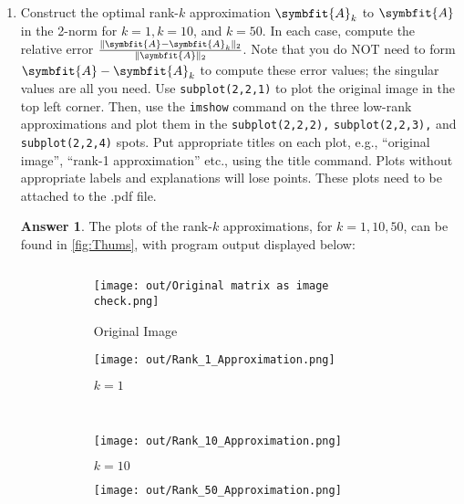 \documentclass{article}
\theoremstyle{definition}
\newtheorem*{answer}{Answer}
\newcommand{\mat}[1]{\symbfit{#1}}
\begin{document}
\begin{enumerate}[leftmargin=\labelsep]
\begin{enumerate}
		      \item Construct the optimal rank-\(k\) approximation \(\mat{A}_k\) to \(\mat{A}\) in the 2-norm for \(k = 1, k = 10\), and \(k = 50\). In each case, compute the relative error \(\frac{\|\mat{A} - \mat{A}_k\|_2}{\|\mat{A}\|_2}\). Note that you do NOT need to form \(\mat{A} - \mat{A}_k\) to compute these error values; the singular values are all you need. Use \texttt{subplot(2,2,1)} to plot the original image in the top left corner. Then, use the \texttt{imshow} command on the three low-rank approximations and plot them in the \texttt{subplot(2,2,2),} \texttt{subplot(2,2,3),} and \texttt{subplot(2,2,4)} spots. Put appropriate titles on each plot, e.g., ``original image'', ``rank-1 approximation'' etc., using the title command. Plots without appropriate labels and explanations will lose points. These plots need to be attached to the .pdf file.
		            \begin{answer} The plots of the rank-\(k\) approximations, for \(k=1,10,50\), can be found in \cref{fig:Thums}, with program output displayed below:
			            \begin{mdframed}[backgroundcolor=lightgray]
				            \inputminted{text}{out/output.txt}
			            \end{mdframed}
			            \begin{figure}[H]
				            \centering
				            \begin{subfigure}{0.225\textwidth}
					            \centering
					            \texttt{[image: out/Original matrix as image check.png]}
					            \caption{Original Image}\label{fig:ogThumb}
				            \end{subfigure}\qquad
				            \begin{subfigure}{0.225\textwidth}
					            \centering
					            \texttt{[image: out/Rank\_1\_Approximation.png]}
					            \caption{\(k=1\)}\label{fig:Thumb1}
				            \end{subfigure}\\
				            \begin{subfigure}{0.225\textwidth}
					            \centering
					            \texttt{[image: out/Rank\_10\_Approximation.png]}
					            \caption{\(k=10\)}\label{fig:Thumb10}
				            \end{subfigure}\qquad
				            \begin{subfigure}{0.225\textwidth}
					            \centering
					            \texttt{[image: out/Rank\_50\_Approximation.png]}

\end{subfigure}
\end{figure}
\end{answer}
\end{enumerate}
\end{enumerate}
\end{document}
